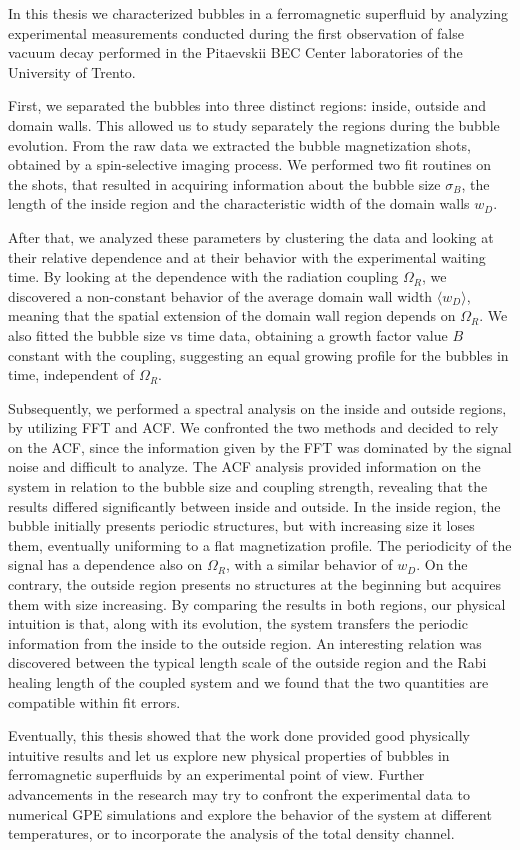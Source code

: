 In this thesis we characterized bubbles in a ferromagnetic superfluid by analyzing experimental measurements conducted during the first observation of false vacuum decay performed in the Pitaevskii BEC Center laboratories of the University of Trento. 

First, we separated the bubbles into three distinct regions: inside, outside and domain walls. This allowed us to study separately the regions during the bubble evolution. From the raw data we extracted the bubble magnetization shots, obtained by a spin-selective imaging process. We performed two fit routines on the shots, that resulted in acquiring information about the bubble size $\sigma_B$, the length of the inside region and the characteristic width of the domain walls $w_D$. 

After that, we analyzed these parameters by clustering the data and looking at their relative dependence and at their behavior with the experimental waiting time. By looking at the dependence with the radiation coupling $\Omega_R$, we discovered a non-constant behavior of the average domain wall width $\langle w_D\rangle$, meaning that the spatial extension of the domain wall region depends on $\Omega_R$. We also fitted the bubble size vs time data, obtaining a growth factor value $B$ constant with the coupling, suggesting an equal growing profile for the bubbles in time, independent of $\Omega_R$.

Subsequently, we performed a spectral analysis on the inside and outside regions, by utilizing FFT and ACF. We confronted the two methods and decided to rely on the ACF, since the information given by the FFT was dominated by the signal noise and difficult to analyze. 
The ACF analysis provided information on the system in relation to the bubble size and coupling strength, revealing that the results differed significantly between inside and outside.
In the inside region, the bubble initially presents periodic structures, but with increasing size it loses them, eventually uniforming to a flat magnetization profile. The periodicity of the signal has a dependence also on $\Omega_R$, with a similar behavior of $w_D$. On the contrary, the outside region presents no structures at the beginning but acquires them with size increasing. By comparing the results in both regions, our physical intuition is that, along with its evolution, the system transfers the periodic information from the inside to the outside region. An interesting relation was discovered between the typical length scale of the outside region and the Rabi healing length of the coupled system and we found that the two quantities are compatible within fit errors.

Eventually, this thesis showed that the work done provided good physically intuitive results and let us explore new physical properties of bubbles in ferromagnetic superfluids by an experimental point of view. Further advancements in the research may try to confront the experimental data to numerical GPE simulations and explore the behavior of the system at different temperatures, or to incorporate the analysis of the total density channel.
